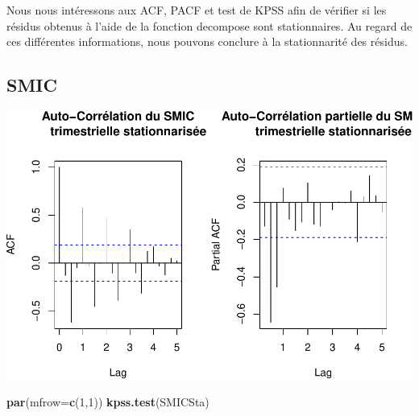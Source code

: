 \documentclass[11pt,]{article}
\newenvironment{Shaded}{\begin{snugshade}}{\end{snugshade}}
\newcommand{\KeywordTok}[1]{\textcolor[rgb]{0.13,0.29,0.53}{\textbf{{#1}}}}
\newcommand{\DataTypeTok}[1]{\textcolor[rgb]{0.13,0.29,0.53}{{#1}}}
\newcommand{\DecValTok}[1]{\textcolor[rgb]{0.00,0.00,0.81}{{#1}}}
\newcommand{\StringTok}[1]{\textcolor[rgb]{0.31,0.60,0.02}{{#1}}}
\newcommand{\NormalTok}[1]{{#1}}
\begin{document}
Nous nous intéressons aux ACF, PACF et test de KPSS afin de vérifier si
les résidus obtenus à l'aide de la fonction decompose sont
stationnaires. Au regard de ces différentes informations, nous pouvons
conclure à la stationnarité des résidus.

\subsection{SMIC}\label{smic-1}

\begin{Shaded}
\end{Shaded}

\includegraphics{doc_files/figure-latex/unnamed-chunk-8-1.pdf}

\begin{Shaded}
\begin{Highlighting}[]
  \KeywordTok{par}\NormalTok{(}\DataTypeTok{mfrow=}\KeywordTok{c}\NormalTok{(}\DecValTok{1}\NormalTok{,}\DecValTok{1}\NormalTok{))}
  \KeywordTok{kpss.test}\NormalTok{(SMICSta)}
\end{Highlighting}
\end{Shaded}
\end{document}
